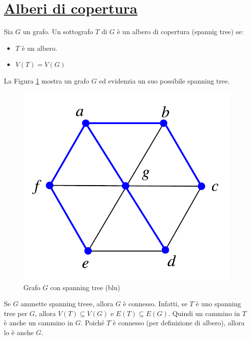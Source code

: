 \documentclass[oneside]{book}
\begin{document}
\section{\underline{Alberi di copertura}}
\begin{tcolorbox}[colback=yellow!30, colframe=yellow!30!black, title=Albero di copertura]
Sia $G$ un grafo. Un sottografo $T$ di $G$ è un albero di copertura (spannig tree) se:
\begin{itemize}
\item $T$ è un albero.
\item $V(T)=V(G)$
\end{itemize}
\end{tcolorbox}

La Figura \ref{spanning} mostra un grafo $G$ ed evidenzia un suo possibile
spanning tree.

\begin{figure}[H]
\centering
\includegraphics[scale = 0.6]{figures/spanningtree.pdf}
\caption{Grafo $G$ con spanning tree (blu)}
\label{spanning}
\end{figure}

\begin{osservaz}
Se $G$ ammette spanning treee, allora $G$ è connesso. Infatti, se
$T$ è uno spanning tree per $G$, allora $V(T)\subseteq V(G)$ e
$E(T)\subseteq E(G)$. Quindi un cammino in $T$ è anche un cammino
in $G$. Poiché $T$ è connesso (per definizione di albero), allora
lo è anche $G$.
\end{osservaz}
\end{document}
